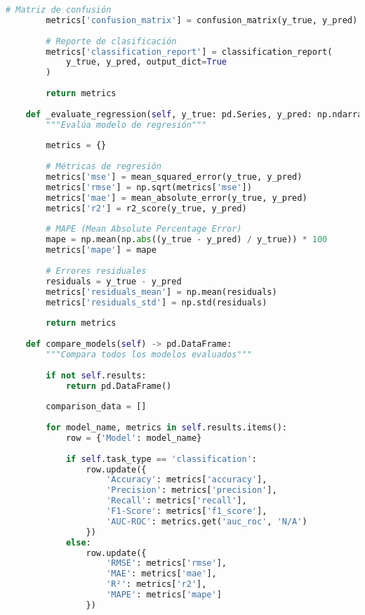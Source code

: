 \begin{lstlisting}[language=Python, caption=Sistema completo de evaluación]
        # Matriz de confusión
        metrics['confusion_matrix'] = confusion_matrix(y_true, y_pred)
        
        # Reporte de clasificación
        metrics['classification_report'] = classification_report(
            y_true, y_pred, output_dict=True
        )
        
        return metrics
    
    def _evaluate_regression(self, y_true: pd.Series, y_pred: np.ndarray) -> Dict[str, Any]:
        """Evalúa modelo de regresión"""
        
        metrics = {}
        
        # Métricas de regresión
        metrics['mse'] = mean_squared_error(y_true, y_pred)
        metrics['rmse'] = np.sqrt(metrics['mse'])
        metrics['mae'] = mean_absolute_error(y_true, y_pred)
        metrics['r2'] = r2_score(y_true, y_pred)
        
        # MAPE (Mean Absolute Percentage Error)
        mape = np.mean(np.abs((y_true - y_pred) / y_true)) * 100
        metrics['mape'] = mape
        
        # Errores residuales
        residuals = y_true - y_pred
        metrics['residuals_mean'] = np.mean(residuals)
        metrics['residuals_std'] = np.std(residuals)
        
        return metrics
    
    def compare_models(self) -> pd.DataFrame:
        """Compara todos los modelos evaluados"""
        
        if not self.results:
            return pd.DataFrame()
        
        comparison_data = []
        
        for model_name, metrics in self.results.items():
            row = {'Model': model_name}
            
            if self.task_type == 'classification':
                row.update({
                    'Accuracy': metrics['accuracy'],
                    'Precision': metrics['precision'],
                    'Recall': metrics['recall'],
                    'F1-Score': metrics['f1_score'],
                    'AUC-ROC': metrics.get('auc_roc', 'N/A')
                })
            else:
                row.update({
                    'RMSE': metrics['rmse'],
                    'MAE': metrics['mae'],
                    'R²': metrics['r2'],
                    'MAPE': metrics['mape']
                })
            

\end{lstlisting}
